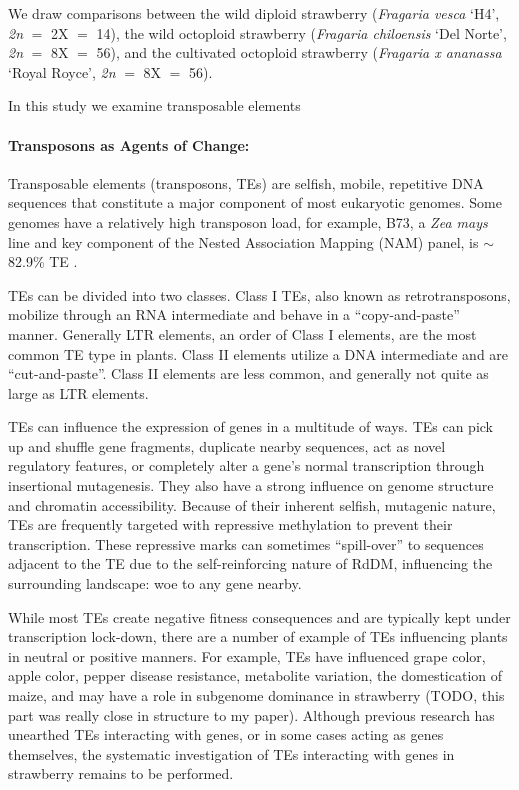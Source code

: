 \documentclass[fleqn,10pt]{olplainarticle}
\begin{document}
We draw comparisons between the wild diploid strawberry (\textit{Fragaria vesca} `H4', \textit{2n} $=$ 2X $=$ 14), the wild octoploid strawberry (\textit{Fragaria chiloensis} `Del Norte', \textit{2n} $=$ 8X $=$ 56), and the cultivated octoploid strawberry (\textit{Fragaria x ananassa} `Royal Royce', \textit{2n} $=$ 8X $=$ 56).

In this study we examine transposable elements


\paragraph{Transposons as Agents of Change:}
Transposable elements (transposons, TEs) are selfish, mobile, repetitive DNA sequences that constitute a major component of most eukaryotic genomes.
Some genomes have a relatively high transposon load, for example, B73, a \textit{Zea mays} line and key component of the Nested Association Mapping (NAM) panel, is $\sim$82.9\% TE \cite{Hufford2021}.

TEs can be divided into two classes.
Class I TEs, also known as retrotransposons, mobilize through an RNA intermediate and behave in a ``copy-and-paste'' manner.
Generally LTR elements, an order of Class I elements, are the most common TE type in plants.
Class II elements utilize a DNA intermediate and are ``cut-and-paste''.
Class II elements are less common, and generally not quite as large as LTR elements.

TEs can influence the expression of genes in a multitude of ways.
TEs can pick up and shuffle gene fragments, duplicate nearby sequences, act as novel regulatory features, or completely alter a gene's normal transcription through insertional mutagenesis.
They also have a strong influence on genome structure and chromatin accessibility.
Because of their inherent selfish, mutagenic nature, TEs are frequently targeted with repressive methylation to prevent their transcription.
These repressive marks can sometimes ``spill-over'' to sequences adjacent to the TE due to the self-reinforcing nature of RdDM, influencing the surrounding landscape: woe to any gene nearby.

While most TEs create negative fitness consequences and are typically kept under transcription lock-down, there are a number of example of TEs influencing plants in neutral or positive manners.
For example, TEs have influenced grape color, apple color, pepper disease resistance, metabolite variation, the domestication of maize, and may have a role in subgenome dominance in strawberry (TODO, this part was really close in structure to my paper).
Although previous research has unearthed TEs interacting with genes, or in some cases acting as genes themselves, the systematic investigation of TEs interacting with genes in strawberry remains to be performed.
\end{document}
